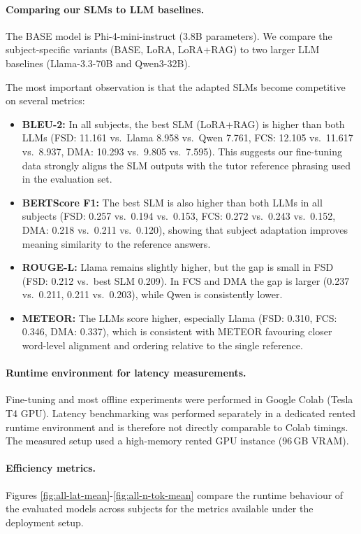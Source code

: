 \paragraph{Comparing our SLMs to LLM baselines.}
The BASE model is Phi-4-mini-instruct (3.8B parameters). We compare the subject-specific variants (BASE, LoRA, LoRA+RAG) to two larger LLM baselines (Llama-3.3-70B and Qwen3-32B).

The most important observation is that the adapted SLMs become competitive on several metrics:

\begin{itemize}
    \item \textbf{BLEU-2:} In all subjects, the best SLM (LoRA+RAG) is higher than both LLMs
    (FSD: 11.161 vs.\ Llama 8.958 vs.\ Qwen 7.761,
     FCS: 12.105 vs.\ 11.617 vs.\ 8.937,
     DMA: 10.293 vs.\ 9.805 vs.\ 7.595).
    This suggests our fine-tuning data strongly aligns the SLM outputs with the tutor reference phrasing used in the evaluation set.
    \item \textbf{BERTScore F1:} The best SLM is also higher than both LLMs in all subjects
    (FSD: 0.257 vs.\ 0.194 vs.\ 0.153,
     FCS: 0.272 vs.\ 0.243 vs.\ 0.152,
     DMA: 0.218 vs.\ 0.211 vs.\ 0.120),
    showing that subject adaptation improves meaning similarity to the reference answers.
    \item \textbf{ROUGE-L:} Llama remains slightly higher, but the gap is small in FSD
    (FSD: 0.212 vs.\ best SLM 0.209).
    In FCS and DMA the gap is larger (0.237 vs.\ 0.211, 0.211 vs.\ 0.203), while Qwen is consistently lower.
    \item \textbf{METEOR:} The LLMs score higher, especially Llama (FSD: 0.310, FCS: 0.346, DMA: 0.337),
    which is consistent with METEOR favouring closer word-level alignment and ordering relative to the single reference.
\end{itemize}

\paragraph{Runtime environment for latency measurements.}
Fine-tuning and most offline experiments were performed in Google Colab (Tesla T4 GPU). Latency benchmarking was performed separately in a dedicated rented runtime environment and is therefore not directly comparable to Colab timings. The measured setup used a high-memory rented GPU instance (96\,GB VRAM).

\paragraph{Efficiency metrics.}
Figures \ref{fig:all-lat-mean}-\ref{fig:all-n-tok-mean} compare the runtime behaviour of the evaluated models across subjects for the metrics available under the deployment setup.

